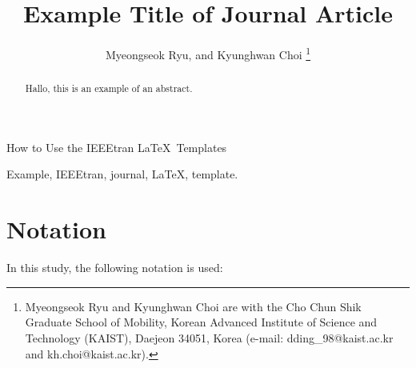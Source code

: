 \documentclass[lettersize,journal]{IEEEtran}
\begin{document}
\title{
    Example Title of Journal Article
} %

\author{
  Myeongseok Ryu, and Kyunghwan Choi
\thanks{
    Myeongseok Ryu and Kyunghwan Choi are with the Cho Chun Shik Graduate School of Mobility, Korean Advanced Institute of Science and Technology (KAIST), Daejeon 34051, Korea (e-mail: dding\_98@kaist.ac.kr and kh.choi@kaist.ac.kr).
    }}

%
{How to Use the IEEEtran \LaTeX \ Templates}

\maketitle

\begin{abstract}
  Hallo, this is an example of an abstract.
  \lipsum[1]
\end{abstract}

\begin{IEEEkeywords}
    Example, IEEEtran, journal, \LaTeX, template.
\end{IEEEkeywords}

\section*{Notation}
In this study, the following notation is used:
\end{document}
